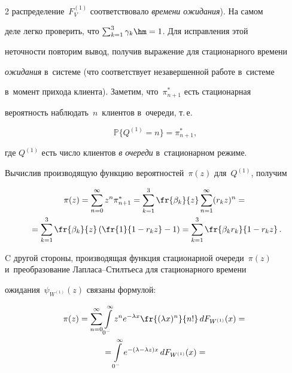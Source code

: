 \begin{multicols}{2}
распределение~$F_V^{(1)}$ соответствовало  \textit{времени ожидания}). На самом 


деле легко проверить, что $\sum\nolimits_{k=1}^3 \gamma_k\hm=1$. Для исправления этой 


неточности повторим вывод, получив выражение для стационарного времени 


\textit{ожидания} в~сис\-те\-ме (что  соответствует незавершенной работе в~сис\-те\-ме 


в~момент прихода клиента). Заметим, что~$\pi_{n+1}^\ast$ есть стационарная 


вероятность наблюдать~$n$~клиентов в~очереди, т.\,е.


$$


\mathbb{P}\{Q^{(1)}=n\}=\pi_{n+1}^\ast,


$$


где $Q^{(1)}$ есть число клиентов \textit{в очереди} в~стационарном режиме.





Вычислив производящую функцию вероятностей~$\pi (z)$ для~$Q^{(1)}$, получим


\begin{multline*}


    \pi (z)=\sum\limits_{n=0}^\infty z^n \pi_{n+1}^\ast = \sum\limits_{k=1}^3


    \fr{\beta_k }{z}\sum\limits_{n=1}^\infty (r_k z)^n={}\\


    {}=\sum\limits_{k=1}^3 \fr{\beta_k }{z}\left(\fr{1}{1-r_k z}-1\right)=\sum\limits_{k=1}^3 \fr{\beta_k r_k}{1-r_k z}\,.


\end{multline*}





C другой стороны,  производящая функция стационарной очереди~$\pi(z)$ и~преобразование Лап\-ла\-са--Стилть\-еса для стационарного времени 


ожидания~$\psi_{W^{(1)}}(z)$ связаны формулой:


\begin{multline*}


\pi(z)= \sum\limits_{n=0}^{\infty}  \int\limits_{0^-}^{\infty} z^n e^{-\lambda x} \fr{(\lambda x )^n}{n!}\, dF_{W^{(1)}} (x) ={}\\


{}=


\int\limits_{0^-}^{\infty} e^{-(\lambda-\lambda z) x} \, d F_{W^{(1)}} (x) ={}\\



\end{multline*}
\end{multicols}
